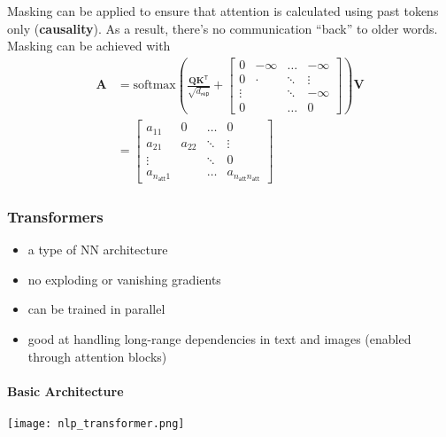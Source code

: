Masking can be applied to ensure that attention is calculated using past tokens only (\textbf{causality}). As a result, there's no communication ``back'' to older words.
Masking can be achieved with
\noindent\begin{align*}
    \mathbf{A} & = \mathrm{softmax}\left(\frac{\mathbf{QK}^{\mathsf{T}}}{\sqrt{d_{\mathsf{rep}}}}+
    \begin{bmatrix}
        0      & -\infty & \hdots & -\infty \\
        0      & \cdot   & \ddots & \vdots  \\
        \vdots &         & \ddots & -\infty \\
        0      &         & \hdots & 0
    \end{bmatrix}
    \right)\mathbf{V}                                                                                                      \\
               & =  \begin{bmatrix}
                        a_{11}                & 0      & \hdots & 0                                    \\
                        a_{21}                & a_{22} & \ddots & \vdots                               \\
                        \vdots                &        & \ddots & 0                                    \\
                        a_{n_{\mathsf{att}}1} &        & \hdots & a_{n_{\mathsf{att}}n_{\mathsf{att}}}
                    \end{bmatrix}
\end{align*}

\subsubsection{Transformers}
\begin{itemize}
    \item a type of NN architecture
    \item no exploding or vanishing gradients
    \item can be trained in parallel
    \item good at handling long-range dependencies in text and images (enabled through attention blocks)
\end{itemize}
\paragraph{Basic Architecture}
\begin{center}
    \texttt{[image: nlp\_transformer.png]}
\end{center}

